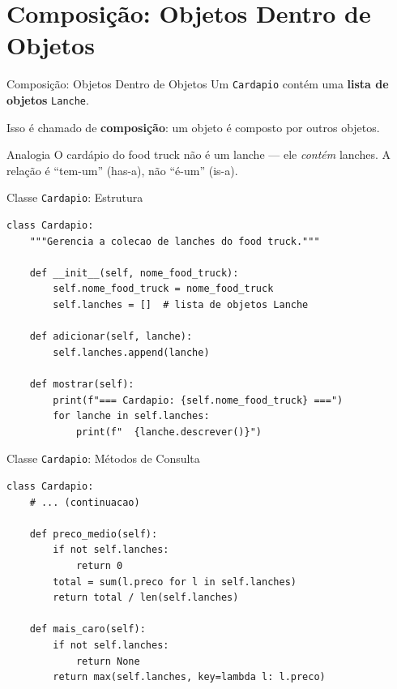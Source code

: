 \documentclass[aspectratio=169]{beamer}
\begin{document}
\section{Composição: Objetos Dentro de Objetos}

\begin{frame}{Composição: Objetos Dentro de Objetos}
  Um \texttt{Cardapio} contém uma \textbf{lista de objetos}
  \texttt{Lanche}.

  \vspace{0.3cm}
  Isso é chamado de \textbf{composição}: um objeto é composto
  por outros objetos.

  \vspace{0.3cm}
  \begin{block}{Analogia}
    O cardápio do food truck não é um lanche --- ele \emph{contém}
    lanches. A relação é ``tem-um'' (has-a), não ``é-um'' (is-a).
  \end{block}
\end{frame}

\begin{frame}[fragile]{Classe \texttt{Cardapio}: Estrutura}
  \begin{lstlisting}
class Cardapio:
    """Gerencia a colecao de lanches do food truck."""

    def __init__(self, nome_food_truck):
        self.nome_food_truck = nome_food_truck
        self.lanches = []  # lista de objetos Lanche

    def adicionar(self, lanche):
        self.lanches.append(lanche)

    def mostrar(self):
        print(f"=== Cardapio: {self.nome_food_truck} ===")
        for lanche in self.lanches:
            print(f"  {lanche.descrever()}")
  \end{lstlisting}
\end{frame}

\begin{frame}[fragile]{Classe \texttt{Cardapio}: Métodos de Consulta}
  \begin{lstlisting}
class Cardapio:
    # ... (continuacao)

    def preco_medio(self):
        if not self.lanches:
            return 0
        total = sum(l.preco for l in self.lanches)
        return total / len(self.lanches)

    def mais_caro(self):
        if not self.lanches:
            return None
        return max(self.lanches, key=lambda l: l.preco)
  \end{lstlisting}
\end{frame}
\end{document}

